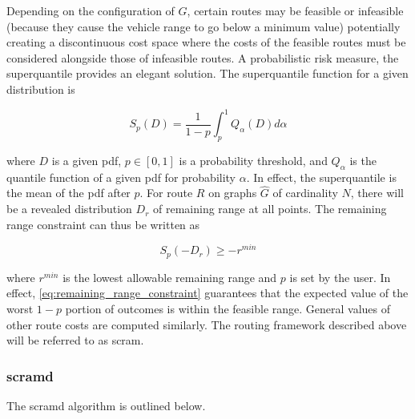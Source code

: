 Depending on the configuration of $G$, certain routes may be feasible or infeasible (because they cause the vehicle range to go below a minimum value) potentially creating a discontinuous cost space where the costs of the feasible routes must be considered alongside those of infeasible routes. A probabilistic risk measure, the superquantile provides an elegant solution. The superquantile function for a given distribution is

\begin{equation}
	S_p(D) = \frac{1}{1-p}\int_{p}^{1}Q_\alpha(D)d\alpha
\end{equation}

where $D$ is a given \gls{pdf}, $p\in[0, 1]$ is a probability threshold, and $Q_\alpha$ is the quantile function of a given \gls{pdf} for probability $\alpha$. In effect, the superquantile is the mean of the \gls{pdf} after $p$. For route $R$ on graphs $\hat{G}$ of cardinality $N$, there will be a revealed distribution $D_r$ of remaining range at all points. The remaining range constraint can thus be written as

\begin{equation}
	S_p(-D_r)\geq -r^{min} \label{eq:remaining_range_constraint}
\end{equation}

where $r^{min}$ is the lowest allowable remaining range and $p$ is set by the user. In effect, \eqref{eq:remaining_range_constraint} guarantees that the expected value of the worst $1-p$ portion of outcomes is within the feasible range. General values of other route costs are computed similarly. The routing framework described above will be referred to as \gls{scram}.

\subsubsection{\gls{scramd}}

The \gls{scramd} algorithm is outlined below.

